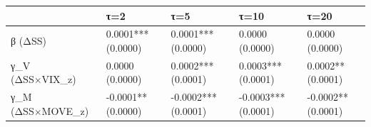 \begin{tabular}{lllll}
\toprule
 & τ=2 & τ=5 & τ=10 & τ=20 \\
\midrule
β (ΔSS) & 0.0001***
(0.0000) & 0.0001***
(0.0000) & 0.0000
(0.0000) & 0.0000
(0.0000) \\
γ_V (ΔSS×VIX_z) & 0.0000
(0.0000) & 0.0002***
(0.0001) & 0.0003***
(0.0001) & 0.0002**
(0.0001) \\
γ_M (ΔSS×MOVE_z) & -0.0001**
(0.0000) & -0.0002***
(0.0001) & -0.0003***
(0.0001) & -0.0002**
(0.0001) \\
\bottomrule
\end{tabular}
